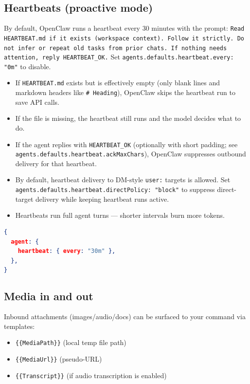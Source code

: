 \subsection{Heartbeats (proactive mode)}


By default, OpenClaw runs a heartbeat every 30 minutes with the prompt:
\texttt{Read HEARTBEAT.md if it exists (workspace context). Follow it strictly. Do not infer or repeat old tasks from prior chats. If nothing needs attention, reply HEARTBEAT\_OK.}
Set \texttt{agents.defaults.heartbeat.every: "0m"} to disable.

\begin{itemize}
  \item If \texttt{HEARTBEAT.md} exists but is effectively empty (only blank lines and markdown headers like \texttt{\# Heading}), OpenClaw skips the heartbeat run to save API calls.
  \item If the file is missing, the heartbeat still runs and the model decides what to do.
  \item If the agent replies with \texttt{HEARTBEAT\_OK} (optionally with short padding; see \texttt{agents.defaults.heartbeat.ackMaxChars}), OpenClaw suppresses outbound delivery for that heartbeat.
  \item By default, heartbeat delivery to DM-style \texttt{user:} targets is allowed. Set \texttt{agents.defaults.heartbeat.directPolicy: "block"} to suppress direct-target delivery while keeping heartbeat runs active.
  \item Heartbeats run full agent turns — shorter intervals burn more tokens.
\end{itemize}


\begin{lstlisting}[language=json]
{
  agent: {
    heartbeat: { every: "30m" },
  },
}
\end{lstlisting}


\subsection{Media in and out}


Inbound attachments (images/audio/docs) can be surfaced to your command via templates:

\begin{itemize}
  \item \texttt{\{\{MediaPath\}\}} (local temp file path)
  \item \texttt{\{\{MediaUrl\}\}} (pseudo-URL)
  \item \texttt{\{\{Transcript\}\}} (if audio transcription is enabled)
\end{itemize}


